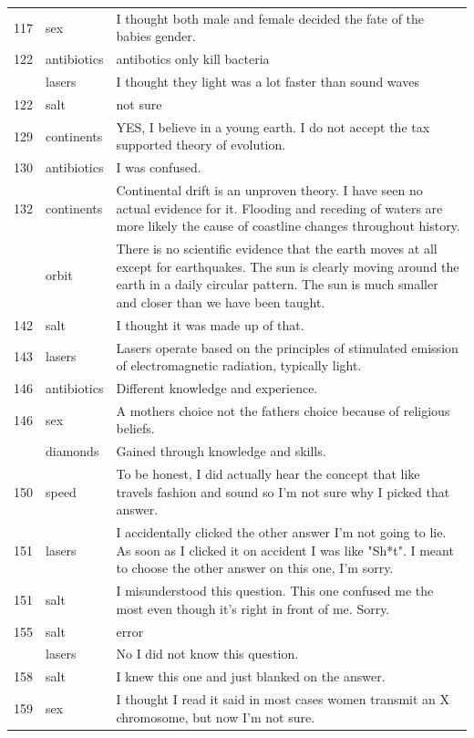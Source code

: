 \documentclass[
  doc,floatsintext]{apa6}
\begin{document}
\begin{longtable}[t]{>{}r>{}l>{\raggedright\arraybackslash}p{30em}}
117 & sex & I thought both male and female decided the fate of the babies gender.\\
122 & antibiotics & antibotics only kill bacteria\\
\addlinespace
122 & lasers & I thought they light was a lot faster than sound waves\\
122 & salt & not sure\\
129 & continents & YES, I believe in a young earth.  I do not accept the tax supported theory of evolution.\\
130 & antibiotics & I was confused.\\
132 & continents & Continental drift is an unproven theory. I have seen no actual evidence for it. Flooding and receding of waters are more likely the cause of coastline changes throughout history.\\
\addlinespace
132 & orbit & There is no scientific evidence that the earth moves at all except for earthquakes. The sun is clearly moving around the earth in a daily circular pattern. The sun is much smaller and closer than we have been taught.\\
142 & salt & I thought it was made up of that.\\
143 & lasers & Lasers operate based on the principles of stimulated emission of electromagnetic radiation, typically light.\\
146 & antibiotics & Different knowledge and experience.\\
146 & sex & A mothers choice not the fathers choice because of religious beliefs.\\
\addlinespace
146 & diamonds & Gained through knowledge and skills.\\
150 & speed & To be honest, I did actually hear the concept that like travels fashion and sound so I’m not sure why I picked that answer.\\
151 & lasers & I accidentally clicked the other answer I'm not going to lie. As soon as I clicked it on accident I was like "Sh*t". I meant to choose the other answer on this one, I'm sorry.\\
151 & salt & I misunderstood this question. This one confused me the most even though it's right in front of me. Sorry.\\
155 & salt & error\\
\addlinespace
158 & lasers & No I did not know this question.\\
158 & salt & I knew this one and just blanked on the answer.\\
159 & sex & I thought I read it said in most cases women transmit an X chromosome, but now I'm not sure.\\

\end{longtable}
\end{document}
